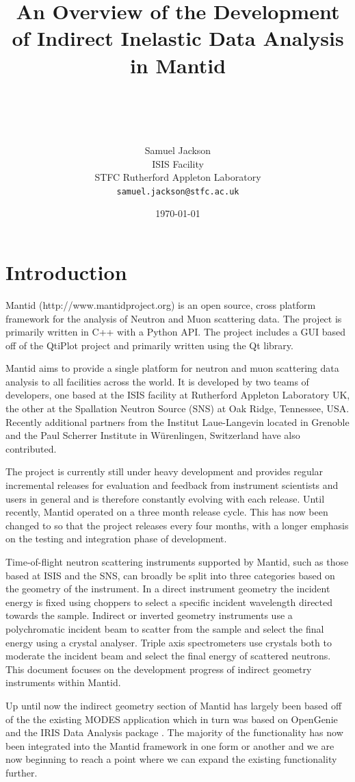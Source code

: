\documentclass[paper=a4, fontsize=11pt]{scrartcl}	%
\title{ \vspace{-1in} 	\usefont{OT1}{bch}{b}{n}
		\huge \strut An Overview of the Development of Indirect Inelastic Data Analysis in Mantid\strut \\
}
\author{ 									\usefont{OT1}{bch}{m}{n}
        Samuel Jackson\\		\usefont{OT1}{bch}{m}{n}
		ISIS Facility\\	\usefont{OT1}{bch}{m}{n}
        STFC Rutherford Appleton Laboratory\\
        \texttt{samuel.jackson@stfc.ac.uk}
}
\date{\today}
\numberwithin{equation}{section}															%
\numberwithin{figure}{section}																%
\numberwithin{table}{section}																%
\begin{document}
\maketitle
\clearpage
\tableofcontents
\section{Introduction}
Mantid (http://www.mantidproject.org) is an open source, cross platform framework for the analysis of Neutron and Muon scattering data. The project is primarily written in C++ with a Python API. The project includes a GUI based off of the QtiPlot project and primarily written using the Qt library.

Mantid aims to provide a single platform for neutron and muon scattering data analysis to all facilities across the world. It is developed by two teams of developers, one based at the ISIS facility at Rutherford Appleton Laboratory UK, the other at the Spallation Neutron Source (SNS) at Oak Ridge, Tennessee, USA. Recently additional partners from the Institut Laue-Langevin located in Grenoble and the Paul Scherrer Institute in Würenlingen, Switzerland have also contributed.

The project is currently still under heavy development and provides regular incremental releases for evaluation and feedback from instrument scientists and users in general and is therefore constantly evolving with each release. Until recently, Mantid operated on a three month release cycle. This has now been changed to so that the project releases every four months, with a longer emphasis on the testing and integration phase of development.

Time-of-flight neutron scattering instruments supported by Mantid, such as those based at ISIS and the SNS, can broadly be split into three categories based on the geometry of the instrument. In a direct instrument geometry the incident energy is fixed using choppers to select a specific incident wavelength directed towards the sample. Indirect or inverted geometry instruments use a polychromatic incident beam to scatter from the sample and select the final energy using a crystal analyser. Triple axis spectrometers use crystals both to moderate the incident beam and select the final energy of scattered neutrons. This document focuses on the development progress of indirect geometry instruments within Mantid.

Up until now the indirect geometry section of Mantid has largely been based off of the the existing MODES application which in turn was based on OpenGenie \cite{wshowells2010} and the IRIS Data Analysis package \cite{wshowells1996}. The majority of the functionality has now been integrated into the Mantid framework in one form or another and we are now beginning to reach a point where we can expand the existing functionality further.
\end{document}
